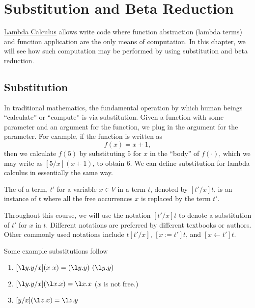 \chapter{Substitution and Beta Reduction}
\label{ch:lambda}

\begin{preamble}
\href{ch:lcs}{Lambda Calculus} allows write code where function abstraction (lambda terms) and function application are the only means of computation.
%
In this chapter, we will see how such computation may be performed by using substitution and beta reduction. 
\end{preamble}

\section{Substitution}
\label{sec:lcsb::sub}

In traditional mathematics, the fundamental operation by which human beings ``calculate'' or ``compute'' is via substitution.
%
Given a function with some parameter and an argument for the function, we plug in the argument for the parameter.
%
For example, if the function is written as 
\[
f(x) = x + 1,
\]  
then we calculate $f(5)$ by substituting $5$ for $x$ in the ``body'' of $f(\cdot)$, which we may write as $[5/x](x+1)$, to obtain $6$.
%
We can define substitution for lambda calculus in essentially the same
way.

\begin{definition}[Substitution]
\label{def:lcsb::basic}
The  of a term, $t'$ for a variable $x \in V$ in a term
$t$, denoted by $[t'/x]t$, is an instance of $t$ where all the free
occurrences $x$ is replaced by the term $t'$.
\end{definition}

Throughout this course, we will use the notation $[t'/x]t$ to denote a
substitution of $t'$ for $x$ in $t$.  Different notations are
preferred by different textbooks or authors. Other commonly used
notations include $t[t'/x]$, $[x:=t']t$, and  $[x \leftarrow t']t$.  

\begin{example}
\label{xmpl:lcsb::basic}
Some example substitutions follow
\begin{enumerate}
\item $[\l y.y/x] (x~x)= (\l y.y)~(\l y.y)$

\item $[\l y.y/x] (\l x.x) = \l x.x$ ($x$ is not free.)

\item $[y/x](\l z.x) = \l z.y$

\end{enumerate}
\end{example}

